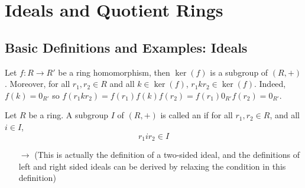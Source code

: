 \chapter{ Ideals and Quotient Rings}
\label{Ideals}
\section{ Basic Definitions and Examples: Ideals}


\begin{remark}
    Let $f:R\rightarrow R'$ be a ring homomorphism, then $\ker(f)$ is a subgroup of $(R,+)$. Moreover, for all $r_1,r_2 \in R$ and all $k \in \ker(f)$, $r_1kr_2 \in \ker(f)$. Indeed, $f(k) = 0_{R'}$ so $f(r_1kr_2) = f(r_1)f(k)f(r_2) = f(r_1)0_{R'}f(r_2) = 0_{R'}$.
\end{remark}

\begin{definition}
    Let $R$ be a ring. A subgroup $I$ of $(R,+)$ is called an  if for all $r_1,r_2 \in R$, and all $i \in I$, \begin{equation}
        r_1ir_2 \in I
    \end{equation}
     \begin{enumerate}
         \item[$\rightarrow$] (This is actually the definition of a two-sided ideal, and the definitions of left and right sided ideals can be derived by relaxing the condition in this definition) 
     \end{enumerate}
\end{definition}

